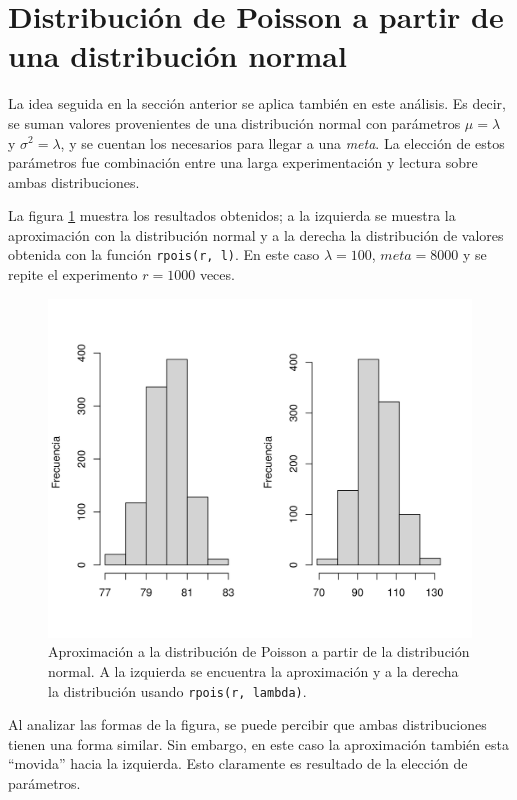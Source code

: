 \documentclass[12pt]{article}
\begin{document}
	\section{Distribución de Poisson a partir de una distribución normal}
	
	La idea seguida en la sección anterior se aplica también en este análisis. Es decir, se suman valores provenientes de una distribución normal con parámetros  $\mu=\lambda$ y $\sigma^2=\lambda$, y se cuentan los necesarios para llegar a una {\em meta}. La elección de estos parámetros fue combinación entre una larga experimentación y lectura sobre ambas distribuciones.
	
	La figura \ref{poisson_normal} muestra los resultados obtenidos; a la izquierda se muestra la aproximación con la distribución normal y a la derecha la distribución de valores obtenida con la función \texttt{rpois(r, l)}. En este caso $\lambda = 100$, $meta=8000$ y se repite el experimento $r=1000$ veces.
	
	\begin{figure}
		\centering
		\includegraphics[scale=0.7]{poisson_normal-m8000-l100-r1000.png}
		\caption{Aproximación a la distribución de Poisson a partir de la distribución normal. A la izquierda se encuentra la aproximación y a la derecha la distribución usando \texttt{rpois(r, lambda)}.}
		\label{poisson_normal}
	\end{figure}
	
	Al analizar las formas de la figura, se puede percibir que ambas distribuciones tienen una forma similar. Sin embargo, en este caso la aproximación también esta ``movida'' hacia la izquierda. Esto claramente es resultado de la elección de parámetros.
	
\end{document}
